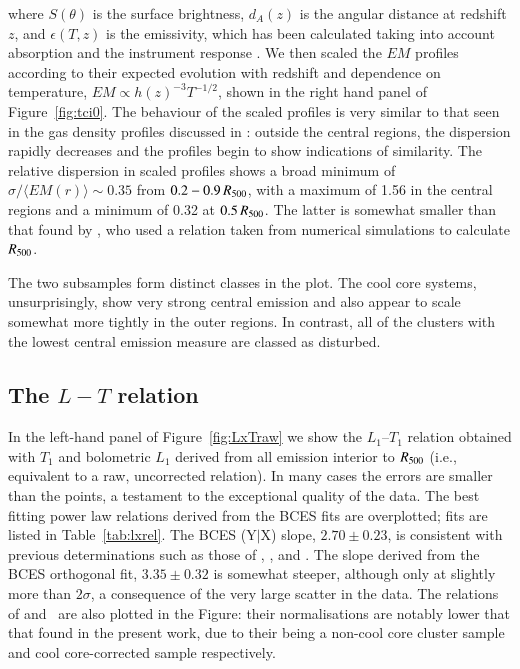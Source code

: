 \documentclass[oldversion]{aa}
\begin{document}
{\noindent where $S(\theta)$ is the surface brightness, $d_A (z)$ is the
angular distance at redshift $z$, and $\epsilon(T,z)$ is the emissivity,
which has been calculated taking into account absorption and the
instrument response \citep[e.g.][]{na99}. We then scaled the $EM$ profiles according to their expected evolution
with redshift and dependence on temperature, $EM \propto
h(z)^{-3} T^{-1/2}$, shown in 
the right hand panel of Figure~\ref{fig:tci0}. The behaviour of the scaled
profiles is very similar
to that seen in the gas density profiles discussed in
\citet{croston08}: outside the central regions, the dispersion rapidly
decreases and the profiles begin to show indications of
similarity. The relative dispersion in scaled profiles 
shows a broad minimum of $\sigma/\langle EM(r) \rangle \sim 0.35$ from
$0.2 - 0.9\,R_{500}$, with a maximum of 1.56 in the central regions
and a minimum of 0.32 at $0.5\,R_{500}$. The latter is somewhat smaller
than that found by \citet{na99}, who used a relation taken from numerical simulations to calculate $R_{500}$. 

The two subsamples form distinct classes in the plot. The cool core systems, unsurprisingly, show very strong central emission and also appear to scale somewhat more tightly in the outer regions. In contrast, all of the clusters with the lowest central emission measure are classed as disturbed.


\subsection{The $L-T$ relation}



In the left-hand panel of Figure~\ref{fig:LxTraw} we show the $L_1$--$T_1$
relation obtained with $T_1$ and bolometric $L_1$ derived from all emission
interior to $R_{500}$ (i.e., equivalent to a raw, uncorrected
relation). In many cases the errors
are smaller than the points, a testament to the exceptional quality of
the data. The best fitting power law relations derived from the BCES fits are overplotted; fits are listed in Table~\ref{tab:lxrel}. The BCES (Y$|$X) slope, $2.70\pm 0.23$, is consistent with previous
determinations such as those of \citet[][$2.64\pm0.16$]{mark98},
\citet[][$2.88\pm0.15$]{ae99},
\citet[][$2.9\pm0.3$]{allenfab98} and \citet[][$2.82\pm0.32$]{nsh02}. The slope derived from the BCES orthogonal fit, $3.35\pm0.32$ is somewhat steeper, although only at slightly more than $2\sigma$, a consequence of the very large scatter in the data. The relations of \citet{ae99} and~\cite{mark98} are also plotted in the Figure: their normalisations are notably lower that that found in the present work, due to their being a non-cool core cluster sample and cool core-corrected sample respectively.

}
\end{document}
